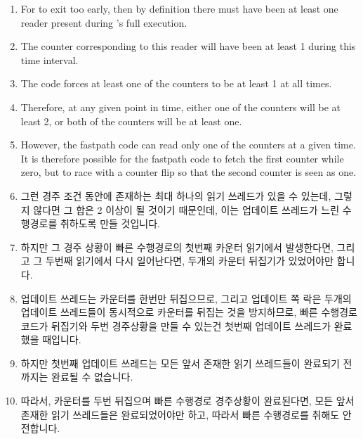 \begin{enumerate}
\item	For  to exit too early, then
	by definition there must have been at least one reader
	present during 's full
	execution.
\item	The counter corresponding to this reader will have been
	at least 1 during this time interval.
\item	The  code forces at least one
	of the counters to be at least 1 at all times.
\item	Therefore, at any given point in time, either one of the
	counters will be at least 2, or both of the counters will
	be at least one.
\item	However, the  fastpath code
	can read only one of the counters at a given time.
	It is therefore possible for the fastpath code to fetch
	the first counter while zero, but to race with a counter
	flip so that the second counter is seen as one.
\fi
\item	그런 경주 조건 동안에 존재하는 최대 하나의 읽기 쓰레드가 있을 수
	있는데, 그렇지 않다면 그 합은 2 이상이 될 것이기 때문인데, 이는
	업데이트 쓰레드가 느린 수행경로를 취하도록 만들 것입니다.
\item	하지만 그 경주 상황이 빠른 수행경로의 첫번째 카운터 읽기에서
	발생한다면, 그리고 그 두번째 읽기에서 다시 일어난다면, 두개의 카운터
	뒤집기가 있었어야만 합니다.
\item	업데이트 쓰레드는 카운터를 한번만 뒤집으므로, 그리고 업데이트 쪽 락은
	두개의 업데이트 쓰레드들이 동시적으로 카운터를 뒤집는 것을 방지하므로,
	빠른 수행경로 코드가 뒤집기와 두번 경주상황을 만들 수 있는건 첫번째
	업데이트 쓰레드가 완료했을 때입니다.
\item	하지만 첫번째 업데이트 쓰레드는 모든 앞서 존재한 읽기 쓰레드들이
	완료되기 전까지는 완료될 수 없습니다.
\item	따라서, 카운터를 두번 뒤집으며 빠른 수행경로 경주상황이 완료된다면,
	모든 앞서 존재한 읽기 쓰레드들은 완료되었어야만 하고, 따라서 빠른
	수행경로를 취해도 안전합니다.
\iffalse

\item	There can be at most one reader persisting through such
	a race condition, as otherwise the sum would be two or
	greater, which would cause the updater to take the slowpath.
\item	But if the race occurs on the fastpath's first read of the
	counters, and then again on its second read, there have
	to have been two counter flips.
\item	Because a given updater flips the counter only once, and
	because the update-side lock prevents a pair of updaters
	from concurrently flipping the counters, the only way that
	the fastpath code can race with a flip twice is if the
	first updater completes.
\item	But the first updater will not complete until after all
	pre-existing readers have completed.
\item	Therefore, if the fastpath races with a counter flip
	twice in succession, all pre-existing readers must have
	completed, so that it is safe to take the fastpath.
\fi
\end{enumerate}

